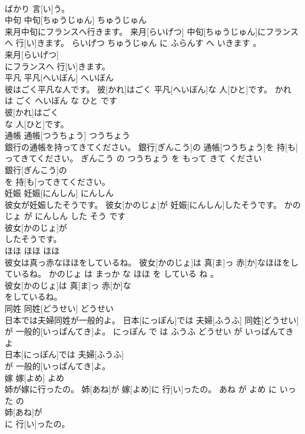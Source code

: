 \documentclass[8pt]{extreport}
\begin{document}
\begin{CJK}{UTF8}{min}
\\	ばかり 言[い]う。			
\\	中旬	中旬[ちゅうじゅん]	ちゅうじゅん	
\\	来月中旬にフランスへ行きます。	来月[らいげつ] 中旬[ちゅうじゅん]にフランスへ 行[い]きます。	らいげつ ちゅうじゅん に ふらんす へ いきます 。	
\\	来月[らいげつ]
\\	にフランスへ 行[い]きます。			
\\	平凡	平凡[へいぼん]	へいぼん	
\\	彼はごく平凡な人です。	彼[かれ]はごく 平凡[へいぼん]な 人[ひと]です。	かれ は ごく へいぼん な ひと です	
\\	彼[かれ]はごく
\\	な 人[ひと]です。			
\\	通帳	通帳[つうちょう]	つうちょう	
\\	銀行の通帳を持ってきてください。	銀行[ぎんこう]の 通帳[つうちょう]を 持[も]ってきてください。	ぎんこう の つうちょう を もって きて ください	
\\	銀行[ぎんこう]の
\\	を 持[も]ってきてください。			
\\	妊娠	妊娠[にんしん]	にんしん	
\\	彼女が妊娠したそうです。	彼女[かのじょ]が 妊娠[にんしん]したそうです。	かのじょ が にんしん した そう です	
\\	彼女[かのじょ]が
\\	したそうです。			
\\	ほほ	ほほ	ほほ	
\\	彼女は真っ赤なほほをしているね。	彼女[かのじょ]は 真[ま]っ 赤[か]なほほをしているね。	かのじょ は まっか な ほほ を している ね 。	
\\	彼女[かのじょ]は 真[ま]っ 赤[か]な
\\	をしているね。			
\\	同姓	同姓[どうせい]	どうせい	
\\	日本では夫婦同姓が一般的よ。	日本[にっぽん]では 夫婦[ふうふ] 同姓[どうせい]が 一般的[いっぱんてき]よ。	にっぽん で は ふうふ どうせい が いっぱんてき よ	
\\	日本[にっぽん]では 夫婦[ふうふ]
\\	が 一般的[いっぱんてき]よ。			
\\	嫁	嫁[よめ]	よめ	
\\	姉が嫁に行ったの。	姉[あね]が 嫁[よめ]に 行[い]ったの。	あね が よめ に いった の	
\\	姉[あね]が
\\	に 行[い]ったの。			

\end{CJK}
\end{document}
